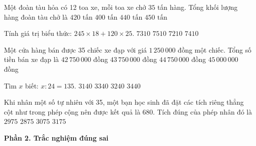 \begin{ex} %
Một đoàn tàu hỏa có 12 toa xe, mỗi toa xe chở $35$ tấn hàng. Tổng khối lượng hàng đoàn tàu chở là
\choice
{\True $420\text{ tấn}$}
{$400\text{ tấn}$}
{$440\text{ tấn}$}
{$450\text{ tấn}$}
\end{ex}

\begin{ex} %
Tính giá trị biểu thức: $245 \times 18 + 120 \times 25$.
\choice
{$7310$}
{$7510$}
{$7210$}
{\True $7410$}
\end{ex}

\begin{ex} %
Một cửa hàng bán được 35 chiếc xe đạp với giá $1\,250\,000$ đồng một chiếc. Tổng số tiền bán xe đạp là
\choice
{$42\,750\,000$ đồng}
{\True $43\,750\,000$ đồng}
{$44\,750\,000$ đồng}
{$45\,000\,000$ đồng}
\end{ex}

\begin{ex} %
Tìm $x$ biết: $x : 24 = 135$.
\choice
{$3140$}
{$3340$}
{\True $3240$}
{$3440$}
\end{ex}

\begin{ex} %
Khi nhân một số tự nhiên với 35, một bạn học sinh đã đặt các tích riêng thẳng cột như trong phép cộng nên được kết quả là $680$. Tích đúng của phép nhân đó là
\choice
{\True $2975$}
{$2875$}
{$3075$}
{$3175$}
\end{ex}

\textbf{Phần 2. Trắc nghiệm đúng sai}

